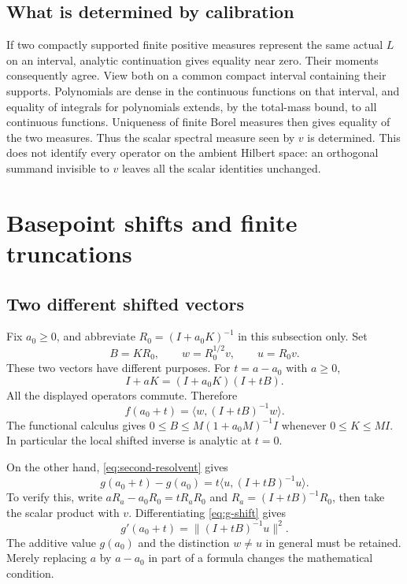 \documentclass[11pt,a4paper]{article}
\numberwithin{equation}{section}
\theoremstyle{definition}
\theoremstyle{remark}
\newcommand{\ip}[2]{\langle #1,#2\rangle}
\newcommand{\norm}[1]{\lVert #1\rVert}
\begin{document}
\subsection{What is determined by calibration}

If two compactly supported finite positive measures represent the same
actual $L$ on an interval, analytic continuation gives equality near
zero. Their moments consequently agree. View both on a common compact
interval containing their supports. Polynomials are dense in the
continuous functions on that interval, and equality of integrals for
polynomials extends, by the total-mass bound, to all continuous functions.
Uniqueness of finite Borel measures then gives equality of the two measures.
Thus the scalar spectral measure seen by $v$ is determined. This does
not identify every operator on the ambient Hilbert space: an orthogonal
summand invisible to $v$ leaves all the scalar identities unchanged.

\section[Shifts and truncations]{Basepoint shifts and finite truncations}\label{sec:shifts}

\subsection{Two different shifted vectors}

Fix $a_0\geq0$, and abbreviate $R_0=(I+a_0K)^{-1}$ in this
subsection only. Set
\begin{equation}\label{eq:shift-data}
B=KR_0,\qquad w=R_0^{1/2}v,\qquad u=R_0v.
\end{equation}
These two vectors have different purposes. For $t=a-a_0$ with
$a\geq0$,
\[
I+aK=(I+a_0K)(I+tB).
\]
All the displayed operators commute. Therefore
\begin{equation}\label{eq:f-shift}
f(a_0+t)=\ip w{(I+tB)^{-1}w}.
\end{equation}
The functional calculus gives
$0\leq B\leq M(1+a_0M)^{-1}I$ whenever $0\leq K\leq MI$.
In particular the local shifted inverse is analytic at $t=0$.

On the other hand, \eqref{eq:second-resolvent} gives
\begin{equation}\label{eq:g-shift}
g(a_0+t)-g(a_0)
=t\ip u{(I+tB)^{-1}u}.
\end{equation}
To verify this, write
$aR_a-a_0R_0=tR_aR_0$ and
$R_a=(I+tB)^{-1}R_0$, then take the scalar product with $v$.
Differentiating \eqref{eq:g-shift} gives
\begin{equation}\label{eq:shift-derivative}
g'(a_0+t)=\norm{(I+tB)^{-1}u}^2.
\end{equation}
The additive value $g(a_0)$ and the distinction $w\ne u$ in general
must be retained. Merely replacing $a$ by $a-a_0$ in part of a
formula changes the mathematical condition.
\end{document}
